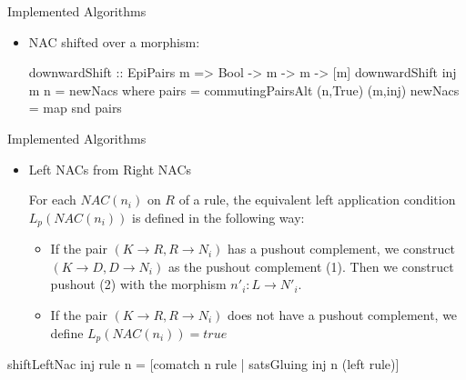 \documentclass[xcolor=dvipsnames,pdf,11pt,handout]{beamer}
\newcommand{\bi}{\begin{itemize}}
\newcommand{\ei}{\end{itemize}}
\newcommand{\tm}{\item}
\begin{document}
\begin{frame}[fragile]{Implemented Algorithms}{}

\bi
\tm NAC shifted over a morphism:
\\
\begin{haskell}
downwardShift :: EpiPairs m => Bool -> m -> m -> [m]
downwardShift inj m n = newNacs
  where
    pairs = commutingPairsAlt (n,True) (m,inj)
    newNacs = map snd pairs
\end{haskell}
\ei
\end{frame}


\begin{frame}[fragile]{Implemented Algorithms}{}

\bi
\tm Left NACs from Right NACs

For each $NAC(n_i)$ on $R$ of a rule, the equivalent left application condition $L_p(NAC(n_i))$ is defined in the following way:

\centerline{}

\begin{itemize}
\item If the pair $(K \rightarrow R, R \rightarrow N_i)$ has a pushout complement, we construct $(K \rightarrow D, D \rightarrow N_i)$ as the pushout complement (1). Then we construct pushout (2) with the morphism $n'_i : L \rightarrow N'_i$.
\item If the pair $(K \rightarrow R, R \rightarrow N_i)$ does not have a pushout complement, we define $L_p(NAC(n_i)) = true$
\end{itemize}
\ei

\begin{haskell}
shiftLeftNac inj rule n = [comatch n rule | satsGluing inj n (left rule)]
\end{haskell}

\end{frame}





\end{document}
